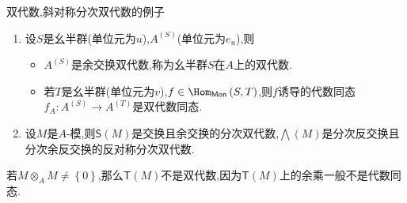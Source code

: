 \begin{example}{双代数,斜对称分次双代数的例子}{}
	\begin{enumerate}
		\item 设$S$是幺半群(单位元为$u$),$A^{\left(S\right)}$(单位元为$e_{u}$),则
		\begin{itemize}
			\item $A^{\left(S\right)}$是余交换双代数,称为幺半群$S$在$A$上的双代数.
			\item 若$T$是幺半群(单位元为$v$),$f\in\Hom_{\mathsf{Mon}}\left(S,T\right)$,则$f$诱导的代数同态$f_{A}:A^{\left(S\right)}\to A^{\left(T\right)}$是双代数同态.
		\end{itemize}
		\item 设$M$是$A$-模,则$\mathsf{S}\left(M\right)$是交换且余交换的分次双代数,$\bigwedge\left(M\right)$是分次反交换且分次余反交换的反对称分次双代数.
	\end{enumerate}
\end{example}

\begin{remark}{}{}
	若$M\otimes_{A}M\neq\left\{0\right\}$,那么$\mathsf{T}\left(M\right)$不是双代数,因为$\mathsf{T}\left(M\right)$上的余乘一般不是代数同态.
\end{remark}





















